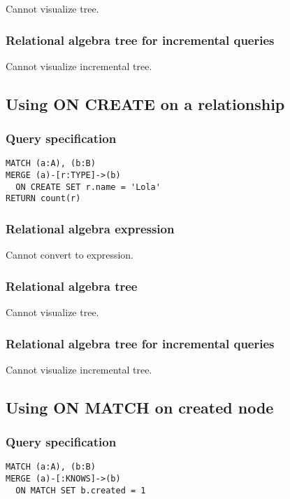 Cannot visualize tree.

\subsubsection*{Relational algebra tree for incremental queries}

Cannot visualize incremental tree.

\subsection{Using ON CREATE on a relationship}

\subsubsection*{Query specification}

\begin{lstlisting}
MATCH (a:A), (b:B)
MERGE (a)-[r:TYPE]->(b)
  ON CREATE SET r.name = 'Lola'
RETURN count(r)
\end{lstlisting}

\subsubsection*{Relational algebra expression}

Cannot convert to expression.

\subsubsection*{Relational algebra tree}

Cannot visualize tree.

\subsubsection*{Relational algebra tree for incremental queries}

Cannot visualize incremental tree.

\subsection{Using ON MATCH on created node}

\subsubsection*{Query specification}

\begin{lstlisting}
MATCH (a:A), (b:B)
MERGE (a)-[:KNOWS]->(b)
  ON MATCH SET b.created = 1
\end{lstlisting}

